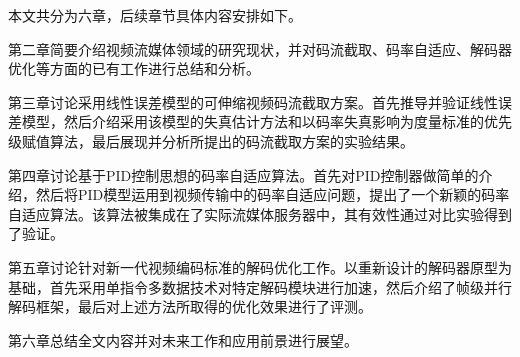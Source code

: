 本文共分为六章，后续章节具体内容安排如下。

第二章简要介绍视频流媒体领域的研究现状，并对码流截取、码率自适应、解码器优化等方面的已有工作进行总结和分析。

第三章讨论采用线性误差模型的可伸缩视频码流截取方案。首先推导并验证线性误差模型，然后介绍采用该模型的失真估计方法和以码率失真影响为度量标准的优先级赋值算法，最后展现并分析所提出的码流截取方案的实验结果。

第四章讨论基于PID控制思想的码率自适应算法。首先对PID控制器做简单的介绍，然后将PID模型运用到视频传输中的码率自适应问题，提出了一个新颖的码率自适应算法。该算法被集成在了实际流媒体服务器中，其有效性通过对比实验得到了验证。

第五章讨论针对新一代视频编码标准的解码优化工作。以重新设计的解码器原型为基础，首先采用单指令多数据技术对特定解码模块进行加速，然后介绍了帧级并行解码框架，最后对上述方法所取得的优化效果进行了评测。

第六章总结全文内容并对未来工作和应用前景进行展望。